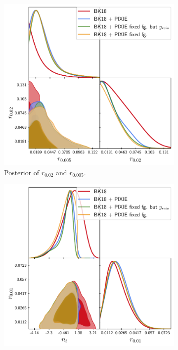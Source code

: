 \begin{figure}[t]
        \centering
        \begin{subfigure}[b]{.49\textwidth}
            \centering
            \includegraphics[width=1\textwidth]{Constraints/BKPIXIE.pdf}
            \caption{Posterior of $r_{0.02}$ and $r_{0.005}$.}
            \label{fig:r_const} 
        \end{subfigure}
        \begin{subfigure}[b]{.49\textwidth}
            \centering
            \includegraphics[width=1\textwidth]{Constraints/nt.pdf}

\end{subfigure}
\end{figure}
